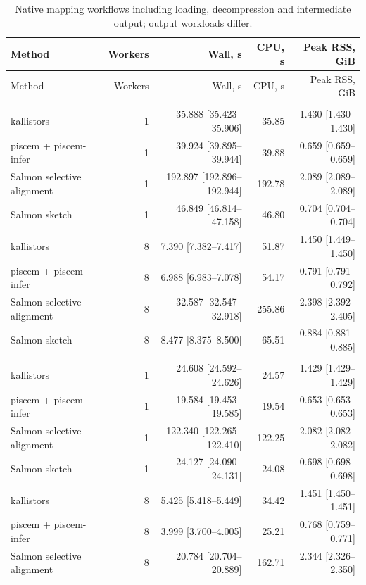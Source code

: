 \begingroup
\small
\setlength{\tabcolsep}{4pt}
\begin{longtable}{@{}lrrrr@{}}
\caption{Native mapping workflows including loading, decompression and intermediate output; output workloads differ.}\label{tab:paper-mapping}\\
\toprule
Method & Workers & Wall, s & CPU, s & Peak RSS, GiB \\
\midrule
\endfirsthead
\toprule
Method & Workers & Wall, s & CPU, s & Peak RSS, GiB \\
\midrule
\endhead
\bottomrule
\endfoot
\addlinespace
\multicolumn{5}{@{}l}{\textit{SRR13638690}} \\
kallistors & 1 & 35.888 [35.423--35.906] & 35.85 & 1.430 [1.430--1.430] \\
piscem + piscem-infer & 1 & 39.924 [39.895--39.944] & 39.88 & 0.659 [0.659--0.659] \\
Salmon selective alignment & 1 & 192.897 [192.896--192.944] & 192.78 & 2.089 [2.089--2.089] \\
Salmon sketch & 1 & 46.849 [46.814--47.158] & 46.80 & 0.704 [0.704--0.704] \\
kallistors & 8 & 7.390 [7.382--7.417] & 51.87 & 1.450 [1.449--1.450] \\
piscem + piscem-infer & 8 & 6.988 [6.983--7.078] & 54.17 & 0.791 [0.791--0.792] \\
Salmon selective alignment & 8 & 32.587 [32.547--32.918] & 255.86 & 2.398 [2.392--2.405] \\
Salmon sketch & 8 & 8.477 [8.375--8.500] & 65.51 & 0.884 [0.881--0.885] \\
\addlinespace
\multicolumn{5}{@{}l}{\textit{SRR13638690-se}} \\
kallistors & 1 & 24.608 [24.592--24.626] & 24.57 & 1.429 [1.429--1.429] \\
piscem + piscem-infer & 1 & 19.584 [19.453--19.585] & 19.54 & 0.653 [0.653--0.653] \\
Salmon selective alignment & 1 & 122.340 [122.265--122.410] & 122.25 & 2.082 [2.082--2.082] \\
Salmon sketch & 1 & 24.127 [24.090--24.131] & 24.08 & 0.698 [0.698--0.698] \\
kallistors & 8 & 5.425 [5.418--5.449] & 34.42 & 1.451 [1.450--1.451] \\
piscem + piscem-infer & 8 & 3.999 [3.700--4.005] & 25.21 & 0.768 [0.759--0.771] \\
Salmon selective alignment & 8 & 20.784 [20.704--20.889] & 162.71 & 2.344 [2.326--2.350] \\

\end{longtable}
